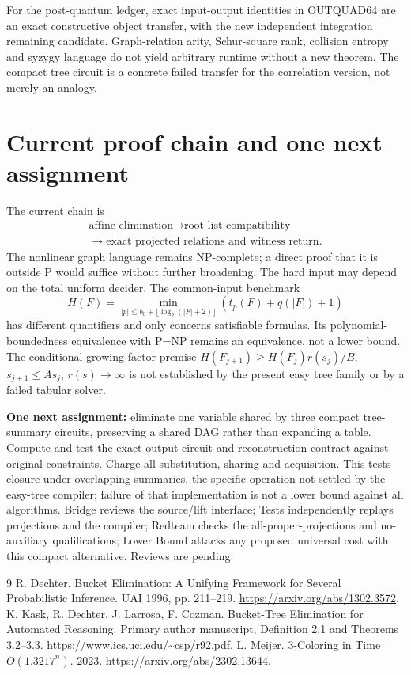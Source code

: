 \documentclass[11pt]{article}
\begin{document}
For the post-quantum ledger, exact input-output identities in OUTQUAD64 are
an exact constructive object transfer, with the new independent integration
remaining candidate. Graph-relation arity, Schur-square rank, collision entropy
and syzygy language do not yield arbitrary runtime without a new theorem.
The compact tree circuit is a concrete failed transfer for the correlation
version, not merely an analogy.

\section{Current proof chain and one next assignment}
The current chain is
\[
 \begin{gathered}\text{affine elimination}\longrightarrow\text{root-list compatibility}\\
 \longrightarrow\text{exact projected relations and witness return}.\end{gathered}
\]
The nonlinear graph language remains NP-complete; a direct proof that it is
outside P would suffice without further broadening. The hard input may depend
on the total uniform decider. The common-input benchmark
\[
 H(F)=\min_{|p|\le b_0+\lfloor\log_2(|F|+2)\rfloor}
                 (t_p(F)+q(|F|)+1)
\]
has different quantifiers and only concerns satisfiable formulas. Its
polynomial-boundedness equivalence with P=NP remains an equivalence, not a
lower bound. The conditional growing-factor premise
$H(F_{j+1})\ge H(F_j)r(s_j)/B$, $s_{j+1}\le As_j$, $r(s)\to\infty$
is not established by the present easy tree family or by a failed tabular solver.

\textbf{One next assignment:} eliminate one variable shared by three compact
tree-summary circuits, preserving a shared DAG rather than expanding a table.
Compute and test the exact output circuit and reconstruction contract against
original constraints. Charge all substitution, sharing and acquisition.
This tests closure under overlapping summaries, the specific operation not
settled by the easy-tree compiler; failure of that implementation is not a
lower bound against all algorithms. Bridge reviews the source/lift interface;
Tests independently replays projections and the compiler; Redteam checks the
all-proper-projections and no-auxiliary qualifications; Lower Bound attacks
any proposed universal cost with this compact alternative. Reviews are pending.

\begin{thebibliography}{9}
 R. Dechter. Bucket Elimination: A Unifying Framework for
Several Probabilistic Inference. UAI 1996, pp. 211--219.
\url{https://arxiv.org/abs/1302.3572}.
 K. Kask, R. Dechter, J. Larrosa, F. Cozman.
Bucket-Tree Elimination for Automated Reasoning. Primary author manuscript,
Definition 2.1 and Theorems 3.2--3.3.
\url{https://www.ics.uci.edu/~csp/r92.pdf}.
 L. Meijer. 3-Coloring in Time $O(1.3217^n)$.
2023. \url{https://arxiv.org/abs/2302.13644}.
\end{thebibliography}
\end{document}
